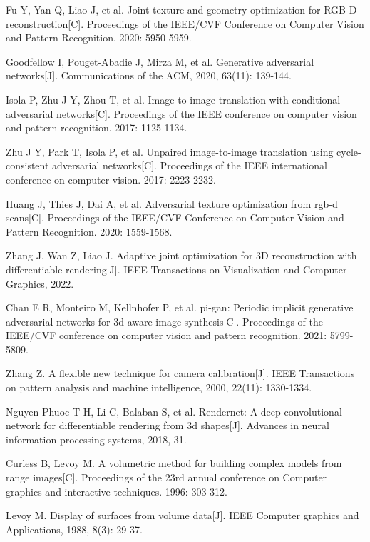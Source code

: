 Fu Y, Yan Q, Liao J, et al. Joint texture and geometry optimization for RGB-D reconstruction[C]. Proceedings of the IEEE/CVF Conference on Computer Vision and Pattern Recognition. 2020: 5950-5959.

Goodfellow I, Pouget-Abadie J, Mirza M, et al. Generative adversarial networks[J]. Communications of the ACM, 2020, 63(11): 139-144.

Isola P, Zhu J Y, Zhou T, et al. Image-to-image translation with conditional adversarial networks[C]. Proceedings of the IEEE conference on computer vision and pattern recognition. 2017: 1125-1134.

Zhu J Y, Park T, Isola P, et al. Unpaired image-to-image translation using cycle-consistent adversarial networks[C]. Proceedings of the IEEE international conference on computer vision. 2017: 2223-2232.

Huang J, Thies J, Dai A, et al. Adversarial texture optimization from rgb-d scans[C]. Proceedings of the IEEE/CVF Conference on Computer Vision and Pattern Recognition. 2020: 1559-1568.


Zhang J, Wan Z, Liao J. Adaptive joint optimization for 3D reconstruction with differentiable rendering[J]. IEEE Transactions on Visualization and Computer Graphics, 2022.


Chan E R, Monteiro M, Kellnhofer P, et al. pi-gan: Periodic implicit generative adversarial networks for 3d-aware image synthesis[C]. Proceedings of the IEEE/CVF conference on computer vision and pattern recognition. 2021: 5799-5809.


Zhang Z. A flexible new technique for camera calibration[J]. IEEE Transactions on pattern analysis and machine intelligence, 2000, 22(11): 1330-1334.

Nguyen-Phuoc T H, Li C, Balaban S, et al. Rendernet: A deep convolutional network for differentiable rendering from 3d shapes[J]. Advances in neural information processing systems, 2018, 31.

Curless B, Levoy M. A volumetric method for building complex models from range images[C]. Proceedings of the 23rd annual conference on Computer graphics and interactive techniques. 1996: 303-312.

Levoy M. Display of surfaces from volume data[J]. IEEE Computer graphics and Applications, 1988, 8(3): 29-37.

